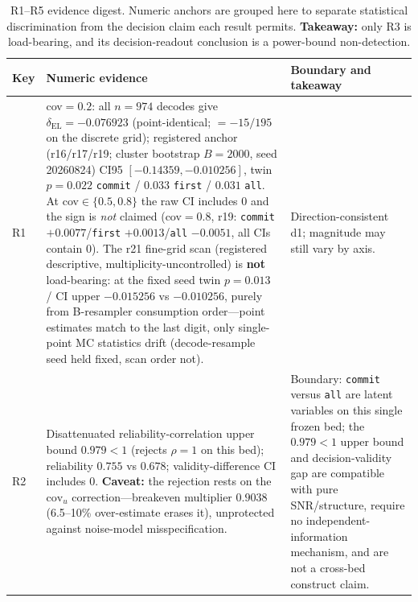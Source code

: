\documentclass{article}
\begin{document}
\begin{table}[!htbp]
  \caption{R1--R5 evidence digest. Numeric anchors are grouped here to separate statistical
  discrimination from the decision claim each result permits. \textbf{Takeaway:} only R3
  is load-bearing, and its decision-readout conclusion is a power-bound non-detection.}
  \label{tab:results}
  \centering
  \small
  \renewcommand{\arraystretch}{1.02}
  \begin{tabular}{@{}p{}p{}p{}@{}}
    \toprule
    \raggedright Key & \raggedright Numeric evidence & \raggedright Boundary and takeaway
    \tabularnewline
    \midrule
    \raggedright R1 & \raggedright cov$=0.2$: all $n{=}974$ decodes give $\delta_{\mathrm{EL}}{=}-0.076923$ (point-identical; $=-15/195$ on the discrete grid); registered anchor (r16/r17/r19; cluster bootstrap $B{=}2000$, seed 20260824) CI95 $[-0.14359,-0.010256]$, twin $p=0.022$ \texttt{commit} / $0.033$ \texttt{first} / $0.031$ \texttt{all}. At cov$\in\{0.5,0.8\}$ the raw CI includes 0 and the sign is \emph{not} claimed (cov$=0.8$, r19: \texttt{commit} $+0.0077$/\texttt{first} $+0.0013$/\texttt{all} $-0.0051$, all CIs contain 0). The r21 fine-grid scan (registered descriptive, multiplicity-uncontrolled) is \textbf{not} load-bearing: at the fixed seed twin $p{=}0.013$ / CI upper $-0.015256$ vs $-0.010256$, purely from B-resampler consumption order---point estimates match to the last digit, only single-point MC statistics drift (decode-resample seed held fixed, scan order not). &
    \raggedright Direction-consistent d1; magnitude may still vary by axis. \tabularnewline
    \raggedright R2 & \raggedright Disattenuated reliability-correlation upper bound
    $0.979<1$ (rejects $\rho{=}1$ on this bed); reliability $0.755$ vs $0.678$;
    validity-difference CI includes 0. \textbf{Caveat:} the rejection rests on the
    $\mathrm{cov}_u$ correction---breakeven multiplier $0.9038$ (6.5--10\% over-estimate
    erases it), unprotected against noise-model misspecification. &
    \raggedright Boundary: \texttt{commit} versus \texttt{all} are latent variables on this
    single frozen bed; the $0.979<1$ upper bound and decision-validity gap are compatible with
    pure SNR/structure, require no independent-information mechanism, and are not a cross-bed
    construct claim.
    \tabularnewline

\end{tabular}
\end{table}
\end{document}
